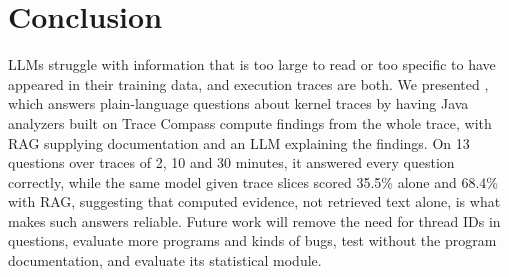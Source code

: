 \section{Conclusion}

LLMs struggle with information that is too large to read or too specific to
have appeared in their training data, and execution traces are both. We
presented \sysname, which answers plain-language questions about kernel
traces by having Java analyzers built on Trace Compass compute findings
from the whole trace, with RAG supplying documentation and an LLM
explaining the findings. On 13 questions over traces of 2, 10 and 30
minutes, it answered every question correctly, while the same model given
trace slices scored 35.5\% alone and 68.4\% with RAG, suggesting that
computed evidence, not retrieved text alone, is what makes such answers
reliable. Future work will remove the need for thread IDs in questions,
evaluate more programs and kinds of bugs, test \sysname without the
program documentation, and evaluate its statistical module.
